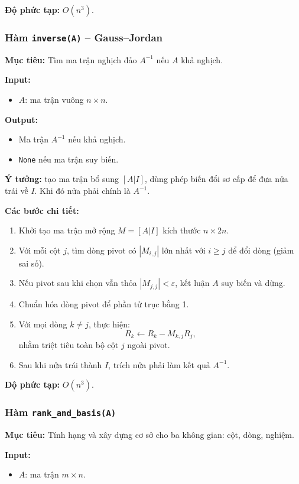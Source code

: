 \documentclass[a4paper]{article}
\begin{document}
\textbf{Độ phức tạp:} \(O(n^3)\).

\subsubsection{Hàm \texttt{inverse(A)} -- Gauss--Jordan}
\textbf{Mục tiêu:} Tìm ma trận nghịch đảo \(A^{-1}\) nếu \(A\) khả nghịch.

\textbf{Input:}
\begin{itemize}
    \item \(A\): ma trận vuông \(n\times n\).
\end{itemize}

\textbf{Output:}
\begin{itemize}
    \item Ma trận \(A^{-1}\) nếu khả nghịch.
    \item \texttt{None} nếu ma trận suy biến.
\end{itemize}

\textbf{Ý tưởng:} tạo ma trận bổ sung \([A|I]\), dùng phép biến đổi sơ cấp để đưa nửa trái về \(I\). Khi đó nửa phải chính là \(A^{-1}\).

\textbf{Các bước chi tiết:}
\begin{enumerate}
    \item Khởi tạo ma trận mở rộng \(M=[A|I]\) kích thước \(n\times 2n\).
    \item Với mỗi cột \(j\), tìm dòng pivot có \(|M_{i,j}|\) lớn nhất với \(i\ge j\) để đổi dòng (giảm sai số).
    \item Nếu pivot sau khi chọn vẫn thỏa \(|M_{j,j}|<\varepsilon\), kết luận \(A\) suy biến và dừng.
    \item Chuẩn hóa dòng pivot để phần tử trục bằng 1.
    \item Với mọi dòng \(k\neq j\), thực hiện:
    \[
    R_k \leftarrow R_k - M_{k,j}R_j,
    \]
    nhằm triệt tiêu toàn bộ cột \(j\) ngoài pivot.
    \item Sau khi nửa trái thành \(I\), trích nửa phải làm kết quả \(A^{-1}\).
\end{enumerate}

\textbf{Độ phức tạp:} \(O(n^3)\).

\subsubsection{Hàm \texttt{rank\_and\_basis(A)}}
\textbf{Mục tiêu:} Tính hạng và xây dựng cơ sở cho ba không gian: cột, dòng, nghiệm.

\textbf{Input:}
\begin{itemize}
    \item \(A\): ma trận \(m\times n\).
\end{itemize}
\end{document}
